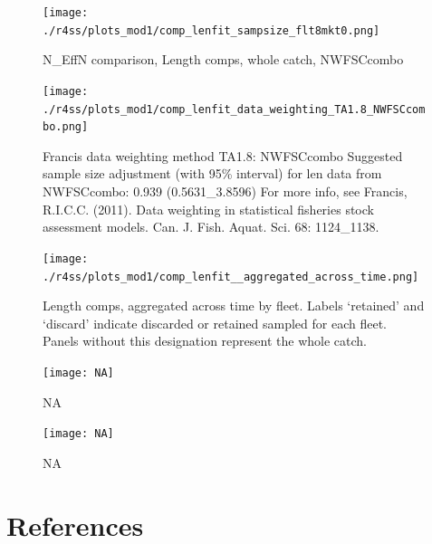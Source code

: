\documentclass[12pt,]{article}
\begin{document}
\begin{figure}
\centering
\texttt{[image: ./r4ss/plots\_mod1/comp\_lenfit\_sampsize\_flt8mkt0.png]}
\caption{N\_EffN comparison, Length comps, whole catch, NWFSCcombo
\label{fig:mod1_32_comp_lenfit_sampsize_flt8mkt0}}
\end{figure}

\begin{figure}
\centering
\texttt{[image: ./r4ss/plots\_mod1/comp\_lenfit\_data\_weighting\_TA1.8\_NWFSCcombo.png]}
\caption{Francis data weighting method TA1.8: NWFSCcombo Suggested
sample size adjustment (with 95\% interval) for len data from
NWFSCcombo: 0.939 (0.5631\_3.8596) For more info, see Francis, R.I.C.C.
(2011). Data weighting in statistical fisheries stock assessment models.
Can. J. Fish. Aquat. Sci. 68: 1124\_1138.
\label{fig:mod1_33_comp_lenfit_data_weighting_TA1.8_NWFSCcombo}}
\end{figure}

\begin{figure}
\centering
\texttt{[image: ./r4ss/plots\_mod1/comp\_lenfit\_\_aggregated\_across\_time.png]}
\caption{Length comps, aggregated across time by fleet. Labels
`retained' and `discard' indicate discarded or retained sampled for each
fleet. Panels without this designation represent the whole catch.
\label{fig:mod1_34_comp_lenfit__aggregated_across_time}}
\end{figure}

\begin{figure}
\centering
\texttt{[image: NA]}
\caption{NA \label{fig:mod1_35_NA}}
\end{figure}

\begin{figure}
\centering
\texttt{[image: NA]}
\caption{NA \label{fig:mod1_36_NA}}
\end{figure}

\FloatBarrier

\FloatBarrier

\FloatBarrier

\FloatBarrier

\FloatBarrier

\FloatBarrier

\FloatBarrier

\FloatBarrier

\newpage

\color{black}

\section*{References}\label{references}
\end{document}

